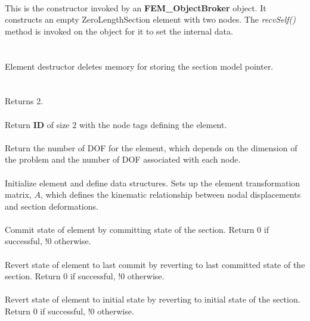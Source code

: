  \\ 
This is the constructor invoked by an {\bf FEM\_ObjectBroker} object. It
constructs an empty ZeroLengthSection element with two nodes.
The {\em recvSelf()} method is
invoked on the object for it to set the internal data. 
\\

 \\
 \\ 
Element destructor deletes memory for storing the section model pointer. 
\\

  \\
 \\
Returns 2.
\\

 \\
Return {\bf ID} of size $2$ with the node tags defining the element.
\\

 \\	
Return the number of DOF for the element, which depends on the dimension of the problem
and the number of DOF associated with each node.
\\

 \\
Initialize element and define data structures.  Sets up the element
transformation matrix, $A$, which defines the kinematic relationship between
nodal displacements and section deformations.
\\

 \\
Commit state of element by committing state of the section.
Return 0 if successful, !0 otherwise.
\\

 \\        
Revert state of element to last commit by reverting to last committed state of the section.
Return 0 if successful, !0 otherwise.
\\

 \\        
Revert state of element to initial state by reverting to initial state of the section.
Return 0 if successful, !0 otherwise.
\\


